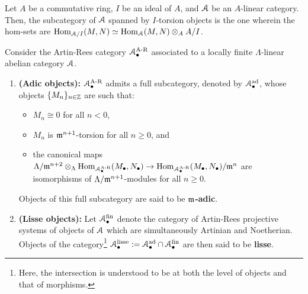                 \begin{definition} \label{def: torsion_objects_in_tensor_categories}
                    Let $A$ be a commutative ring, $I$ be an ideal of $A$, and $\mathcal{A}$ be an $A$-linear category. Then, the subcategory of $\mathcal{A}$ spanned by $I$-torsion objects is the one wherein the hom-sets are $\Hom_{\calA/I}(M, N) \cong \Hom_\calA(M, N) \tensor_A A/I$.
                \end{definition}
                \begin{definition} \label{def: adic_objects_and_lisse_objects_of_artin_rees_categories}
                    Consider the Artin-Rees category $\mathcal{A}_{\bullet}^{\mathrm{A\text{-}R}}$ associated to a locally finite $\Lambda$-linear abelian category $\mathcal{A}$. 
                        \begin{enumerate}
                            \item \textbf{(Adic objects):} $\mathcal{A}_{\bullet}^{\mathrm{A\text{-}R}}$ admits a full subcategory, denoted by $\mathcal{A}_{\bullet}^{\mathrm{ad}}$, whose objects $\{M_n\}_{n \in \mathbb{Z}}$ are such that:
                                \begin{itemize}
                                    \item $M_n \cong 0$ for all $n < 0$,
                                    \item $M_n$ is $\mathfrak{m}^{n + 1}$-torsion for all $n \geq 0$, and
                                    \item the canonical maps $\Lambda/\m^{n + 2} \tensor_{\Lambda} \Hom_{\calA_{\bullet}^{\AR}}(M_{\bullet}, N_{\bullet}) \to \Hom_{\calA_{\bullet}^{\AR}}(M_{\bullet}, N_{\bullet})/\m^n$ are isomorphisms of $\Lambda/\mathfrak{m}^{n + 1}$-modules for all $n \geq 0$.
                                \end{itemize}
                            Objects of this full subcategory are said to be \textbf{$\mathfrak{m}$-adic}.
                            \item \textbf{(Lisse objects):} Let $\mathcal{A}_{\bullet}^{\mathrm{fin}}$ denote the category of Artin-Rees projective systems of objects of $\mathcal{A}$ which are simultaneously Artinian and Noetherian. Objects of the category\footnote{Here, the intersection is understood to be at both the level of objects and that of morphisms.} $\mathcal{A}_{\bullet}^{\mathrm{lisse}} := \mathcal{A}_{\bullet}^{\mathrm{ad}} \cap \mathcal{A}_{\bullet}^{\mathrm{fin}}$ are then said to be \textbf{lisse}. 
                        \end{enumerate}
                \end{definition}
